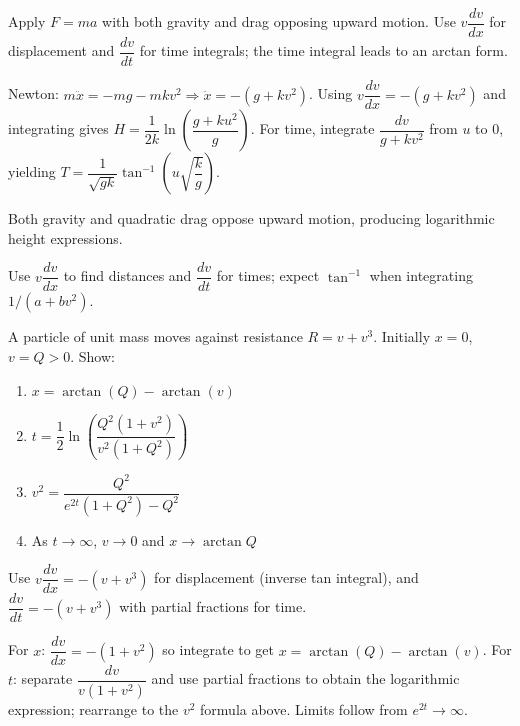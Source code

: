 \begin{hint}
Apply $F=ma$ with both gravity and drag opposing upward motion. Use $v\dfrac{dv}{dx}$ for displacement and $\dfrac{dv}{dt}$ for time integrals; the time integral leads to an arctan form.
\end{hint}

\begin{solution}
Newton: $m\ddot{x}=-mg-mkv^2\Rightarrow\ddot{x}=-(g+kv^2)$. Using $v\dfrac{dv}{dx}=-(g+kv^2)$ and integrating gives $H=\dfrac{1}{2k}\ln\left(\dfrac{g+ku^2}{g}\right)$. For time, integrate $\dfrac{dv}{g+kv^2}$ from $u$ to $0$, yielding $T=\dfrac{1}{\sqrt{gk}}\tan^{-1}\left(u\sqrt{\dfrac{k}{g}}\right)$.
\end{solution}

\begin{takeaways}
\item Both gravity and quadratic drag oppose upward motion, producing logarithmic height expressions.
\item Use $v\dfrac{dv}{dx}$ to find distances and $\dfrac{dv}{dt}$ for times; expect $\tan^{-1}$ when integrating $1/(a+bv^2)$.
\end{takeaways}

\begin{problem}
A particle of unit mass moves against resistance $R=v+v^3$. Initially $x=0$, $v=Q>0$. Show:
\begin{enumerate}[label=\textbf{\alph*.}]
    \item $x=\arctan(Q)-\arctan(v)$
    \item $t=\dfrac{1}{2}\ln\left(\dfrac{Q^2(1+v^2)}{v^2(1+Q^2)}\right)$
    \item $v^2=\dfrac{Q^2}{e^{2t}(1+Q^2)-Q^2}$
    \item As $t\to\infty$, $v\to0$ and $x\to\arctan Q$
\end{enumerate}
\end{problem}

\begin{hint}
Use $v\dfrac{dv}{dx}=-(v+v^3)$ for displacement (inverse tan integral), and $\dfrac{dv}{dt}=-(v+v^3)$ with partial fractions for time.
\end{hint}

\begin{solution}
For $x$: $\dfrac{dv}{dx}=-(1+v^2)$ so integrate to get $x=\arctan(Q)-\arctan(v)$. For $t$: separate $\dfrac{dv}{v(1+v^2)}$ and use partial fractions to obtain the logarithmic expression; rearrange to the $v^2$ formula above. Limits follow from $e^{2t}\to\infty$.
\end{solution}

